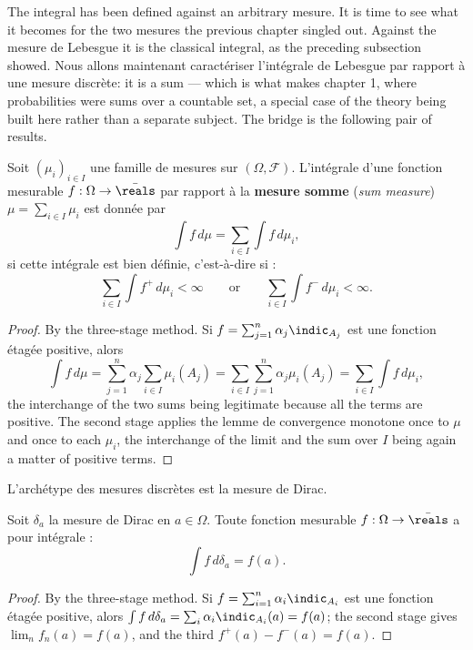 The integral has been defined against an arbitrary mesure. It is time to see what it
becomes for the two mesures the previous chapter singled out. Against the mesure de
Lebesgue it is the classical integral, as the preceding subsection showed. Nous
allons maintenant caractériser l'intégrale de Lebesgue par rapport à une mesure
discrète: it is a sum --- which is what makes chapter 1, where probabilities were
sums over a countable set, a special case of the theory being built here rather than
a separate subject. The bridge is the following pair of results.

\begin{prop}
  Soit $(\mu_{i})_{i \in I}$ une famille de mesures sur $(\Omega,\mathcal{F})$.
  L'intégrale d'une fonction mesurable $f : \Omega \to \bar{\reals}$ par rapport à la
  \textbf{mesure somme} (\textit{sum measure}) $\mu = \sum_{i \in I} \mu_{i}$ est
  donnée par
  \[
    \int f \, d\mu = \sum_{i \in I} \int f \, d\mu_{i} ,
  \]
  si cette intégrale est bien définie, c'est-à-dire si :
  \[
    \sum_{i \in I} \int f^{+} \, d\mu_{i} < \infty
    \qquad \text{or} \qquad
    \sum_{i \in I} \int f^{-} \, d\mu_{i} < \infty .
  \]
\end{prop}

\begin{proof}
  By the three-stage method. Si $f = \sum_{j=1}^{n} \alpha_{j} \indic_{A_{j}}$ est
  une fonction étagée positive, alors
  \[
    \int f \, d\mu = \sum_{j=1}^{n} \alpha_{j} \sum_{i \in I} \mu_{i}(A_{j})
    = \sum_{i \in I} \sum_{j=1}^{n} \alpha_{j} \mu_{i}(A_{j})
    = \sum_{i \in I} \int f \, d\mu_{i} ,
  \]
  the interchange of the two sums being legitimate because all the terms are
  positive. The second stage applies the lemme de convergence monotone once to $\mu$
  and once to each $\mu_{i}$, the interchange of the limit and the sum over $I$ being
  again a matter of positive terms.
\end{proof}

L'archétype des mesures discrètes est la mesure de Dirac.

\begin{prop}
  Soit $\delta_{a}$ la mesure de Dirac en $a \in \Omega$. Toute fonction mesurable
  $f : \Omega \to \bar{\reals}$ a pour intégrale :
  \[
    \int f \, d\delta_{a} = f(a) .
  \]
\end{prop}

\begin{proof}
  By the three-stage method. Si $f = \sum_{i=1}^{n} \alpha_{i} \indic_{A_{i}}$ est
  une fonction étagée positive, alors $\int f \, d\delta_{a} = \sum_{i} \alpha_{i}
  \indic_{A_{i}}(a) = f(a)$; the second stage gives $\lim_{n} f_{n}(a) = f(a)$, and
  the third $f^{+}(a) - f^{-}(a) = f(a)$.
\end{proof}

